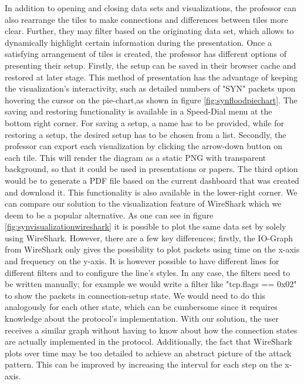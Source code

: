 In addition to opening and closing data sets and visualizations, the professor can also rearrange the tiles to make connections and differences between tiles more clear. Further, they may filter based on the originating data set, which allows to dynamically highlight certain information during the presentation. Once a satisfying arrangement of tiles is created, the professor has different options of presenting their setup. Firstly, the setup can be saved in their browser cache and restored at later stage. This method of presentation has the advantage of keeping the visualization's interactivity, such as detailed numbers of "SYN" packets upon hovering the cursor on the pie-chart,as shown in figure \ref{fig:synfloodpiechart}. 
The saving and  restoring functionality is available in a Speed-Dial menu at the bottom right corner. For saving a setup, a name has to be provided, while for restoring a setup, the desired setup has to be chosen from a list.
Secondly, the professor can export each visualization by clicking the arrow-down button on each tile. This will render the diagram as a static PNG with transparent background, so that it could be used in presentations or papers.
The third option would be to generate a PDF file based on the current dashboard that was created and download it. This functionality is also available in the lower-right corner.
We can compare our solution to the visualization feature of WireShark which we deem to be a popular alternative.
As one can see in figure \ref{fig:synvisualizationwireshark} it is possible to plot the same data set by solely using WireShark. However, there are a few key differences; firstly, the IO-Graph from WireShark only gives the possibility to plot packets using time on the x-axis and frequency on the y-axis. It is however possible to have different lines for different filters and to configure the line's styles. In any case, the filters need to be written manually; for example we would write a filter like "tcp.flags == 0x02" to show the packets in connection-setup state. We would need to do this analogously for each other state, which can be cumbersome since it requires knowledge about the protocol's implementation. With our solution, the user receives a similar graph without having to know about how the connection states are actually implemented in the protocol. Additionally, the fact that WireShark plots over time may be too detailed to achieve an abstract picture of the attack pattern. This can be improved by increasing the interval for each step on the x-axis.
